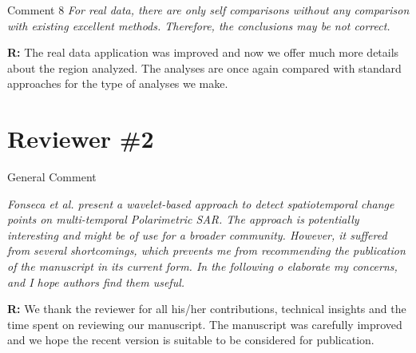\documentclass[11pt]{report}
\begin{document}
\vspace{0.3cm}

\medskip
\begin{mybox}{Comment 8}
\textit{For real data, there are only self comparisons without any comparison with existing excellent methods. Therefore, the
conclusions may be not correct.}


\medskip
\textbf{R:} The real data application was improved and now we offer much more details about the region analyzed. The analyses are once again compared with standard approaches for the type of analyses we make.

\medskip

\end{mybox}


\medskip
\medskip
\medskip




\vspace{0.25cm}

\section*{Reviewer \#2}


\begin{mybox}{General Comment}

\textit{Fonseca et al. present a wavelet-based approach to detect spatiotemporal change points on multi-temporal Polarimetric
SAR. The approach is potentially interesting and might be of use for a broader community. However, it suffered from
several shortcomings, which prevents me from recommending the publication of the manuscript in its current form. In the
following o elaborate my concerns, and I hope authors find them useful.}

\medskip

\textbf{R:} We thank the reviewer for all his/her contributions, technical insights and the time
spent on reviewing our manuscript. The manuscript was carefully improved and we hope the recent version is suitable to be considered for publication.
\end{mybox}
\end{document}
